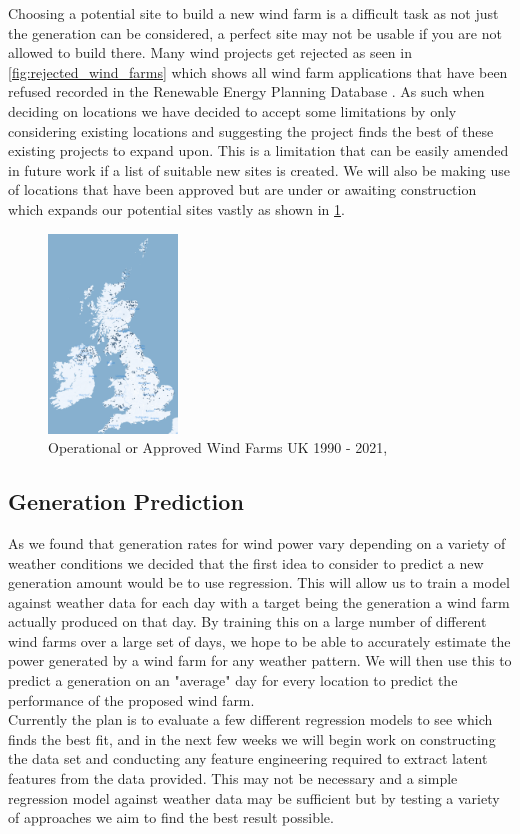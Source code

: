 \documentclass[twoside]{article}
\begin{document}
\noindent Choosing a potential site to build a new wind farm is a difficult task as not just the generation can be considered, a perfect site may not be usable if you are not allowed to build there. Many wind projects get rejected as seen in \ref{fig:rejected_wind_farms} which shows all wind farm applications that have been refused recorded in the Renewable Energy Planning Database \cite{renew_database}. As such when deciding on locations we have decided to accept some limitations by only considering existing locations and suggesting the project finds the best of these existing projects to expand upon. This is a limitation that can be easily amended in future work if a list of suitable new sites is created. We will also be making use of locations that have been approved but are under or awaiting construction which expands our potential sites vastly as shown in \ref{fig:wind_farms}.

\begin{figure}[!h]
    \centering
    \includegraphics[height=200px]{PotentialSites.png}
    \caption{Operational or Approved Wind Farms UK 1990 - 2021,\cite{renew_database}}
    \label{fig:wind_farms}
\end{figure}

\subsection{Generation Prediction}
As we found that generation rates for wind power vary depending on a variety of weather conditions we decided that the first idea to consider to predict a new generation amount would be to use regression. This will allow us to train a model against weather data for each day with a target being  the generation a wind farm actually produced on that day. By training this on a large number of different wind farms over a large set of days, we hope to be able to accurately estimate the power generated by a wind farm for any weather pattern. We will then use this to predict a generation on an "average" day for every location to predict the performance of the proposed wind farm.\\
\noindent Currently the plan is to evaluate a few different regression models to see which finds the best fit, and in the next few weeks we will begin work on constructing the data set and conducting any feature engineering required to extract latent features from the data provided. This may not be necessary and a simple regression model against weather data may be sufficient but by testing a variety of approaches we aim to find the best result possible.
\end{document}
